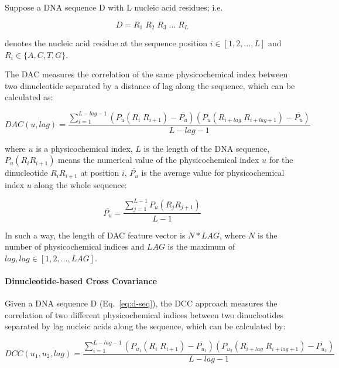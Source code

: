 Suppose a DNA sequence D with L nucleic acid residues; i.e. 

\begin{equation}\label{eq:d-seq}
    D = R_{1}\;R_{2}\;R_{3}\;...\;R_{L}
\end{equation}

denotes the nucleic acid residue at the sequence position $i \in [1,2,...,L]$ and $R_{i} \in \lbrace A,C,T,G\rbrace$.

The \gls{DAC} measures the correlation of the same physicochemical index between two dinucleotide separated by a distance of lag along the sequence, which can be calculated as:

\begin{equation}\label{eq:DAC}
    DAC(u,lag) = \frac{\sum_{i=1}^{L-lag-1}(P_{u}(R_{i}\;R_{i+1}) - \overline{P_{u}})(P_{u}(R_{i+lag}\;R_{i+lag+1}) - \overline{P_{u}})}{L-lag-1}
\end{equation}

where $u$ is a physicochemical index, $L$ is the length of the DNA sequence, $P_{u}(R_{i}R_{i+1})$ means the numerical value of the physicochemical index $u$ for the dinucleotide $R_{i}R_{i+1}$ at position $i$, $\overline{P_{u}}$ is the average value for physicochemical index $u$ along the whole sequence:

\begin{equation}\label{eq:DAC-PU}
    \overline{P_{u}} = \frac{\sum_{j=1}^{L-1}P_{u}(R_{j}R_{j+1})}{L-1}
\end{equation}

In such a way, the length of \gls{DAC} feature vector is $N*LAG$, where $N$ is the number of physicochemical indices and $LAG$ is the maximum of $lag, lag \in [1,2,...,LAG]$.

\paragraph{Dinucleotide-based Cross Covariance}
Given a DNA sequence D (Eq.~\ref{eq:d-seq}), the \gls{DCC} approach measures the correlation of two different physicochemical indices between two dinucleotides separated by lag nucleic acids along the sequence, which can be calculated by:

\begin{equation}\label{eq:DCC}
    DCC(u_{1},u_{2},lag) = \frac{\sum_{i=1}^{L-lag-1}(P_{u_{1}}(R_{i}\;R_{i+1}) - \overline{P_{u_{1}}})(P_{u_{2}}(R_{i+lag}\;R_{i+lag+1}) - \overline{P_{u_{2}}})}{L-lag-1}
\end{equation}

